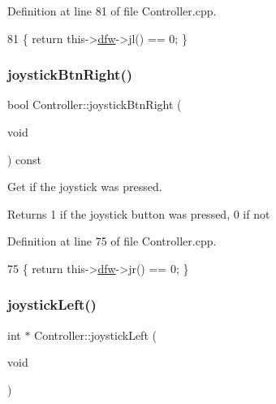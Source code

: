 Definition at line 81 of file Controller.\+cpp.


\begin{DoxyCode}
81 \{ \textcolor{keywordflow}{return} this->\hyperlink{class_controller_af4793ccbf2ecdbfcdb9359bd32b6e8cf}{dfw}->jl() == 0; \}
\end{DoxyCode}
\mbox{\label{class_controller_a16a17aa8cb91dc02c04648c04202b0bc}} 
\subsubsection{\texorpdfstring{joystick\+Btn\+Right()}{joystickBtnRight()}}
{\footnotesize\ttfamily bool Controller\+::joystick\+Btn\+Right (\begin{DoxyParamCaption}\item[{void}]{ }\end{DoxyParamCaption}) const}



Get if the joystick was pressed. 

\begin{DoxyReturn}{Returns}
1 if the joystick button was pressed, 0 if not 
\end{DoxyReturn}


Definition at line 75 of file Controller.\+cpp.


\begin{DoxyCode}
75 \{ \textcolor{keywordflow}{return} this->\hyperlink{class_controller_af4793ccbf2ecdbfcdb9359bd32b6e8cf}{dfw}->jr() == 0; \}
\end{DoxyCode}
\mbox{\label{class_controller_a98b5d8b11463780ac75d90fed3bd627d}} 
\subsubsection{\texorpdfstring{joystick\+Left()}{joystickLeft()}}
{\footnotesize\ttfamily int $\ast$ Controller\+::joystick\+Left (\begin{DoxyParamCaption}\item[{void}]{ }\end{DoxyParamCaption})}



